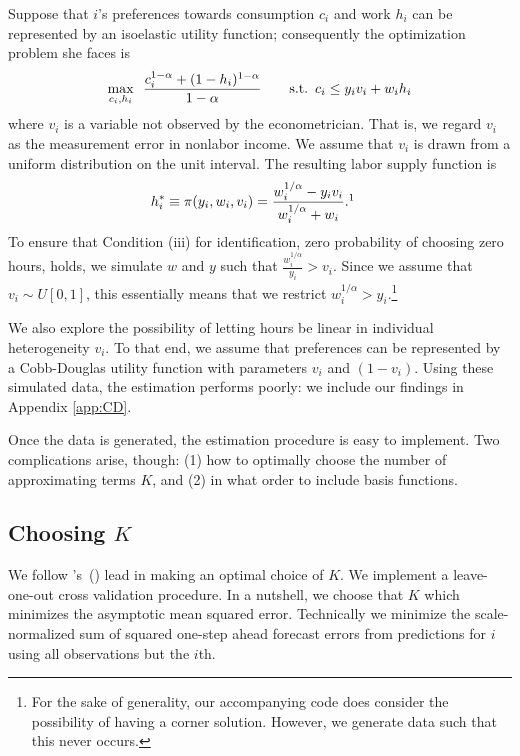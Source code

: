 \documentclass[11pt,letterpaper]{article}                  %
\newcommand\citepos[1]{\citeauthor{#1}'s\ (\citeyear{#1})}
\begin{document}
Suppose that $i$'s preferences towards consumption $c_i$ and work $h_i$ can be represented by an isoelastic utility function; consequently the optimization problem she faces is 
\begin{align*}
	\max_{c_i, h_i} \enskip \frac{c_i^{1-\alpha} + (1-h_i)^{1-\alpha}}{1-\alpha} \qquad \text{s.t.} \enskip c_i \leq y_i v_i + w_i h_i
\end{align*}
where $v_i$ is a variable not observed by the econometrician.
That is, we regard $v_i$ as the measurement error in nonlabor income.
We assume that $v_i$ is drawn from a uniform distribution on the unit interval.
The resulting labor supply function is
\begin{align*}
	h_i^* &\equiv \pi (y_i, w_i, v_i) = \frac{w_i^{1/\alpha} - y_i v_i}{w_i^{1/\alpha} + w_i}.\footnotemark
\end{align*}
To ensure that Condition (iii) for identification, zero probability of choosing zero hours, holds, we simulate $w$ and $y$ such that $\frac{w_i^{1/\alpha}}{y_i} > v_i$.
Since we assume that $v_i \sim U[0, 1]$, this essentially means that we restrict $w_i^{1/\alpha} > y_i$.\footnote{For the sake of generality, our accompanying code does consider the possibility of having a corner solution. However, we generate data such that this never occurs.}

We also explore the possibility of letting hours be linear in individual heterogeneity $v_i$.
To that end, we assume that preferences can be represented by a Cobb-Douglas utility function with parameters $v_i$ and $(1-v_i)$.
Using these simulated data, the estimation performs poorly: we include our findings in Appendix \ref{app:CD}.

\medskip
Once the data is generated, the estimation procedure is easy to implement.
Two complications arise, though: (1) how to optimally choose the number of approximating terms $K$, and (2) in what order to include basis functions.

\subsection{Choosing $K$}

We follow \citepos{Blomquist2002} lead in making an optimal choice of $K$.
We implement a leave-one-out cross validation procedure.
In a nutshell, we choose that $K$ which minimizes the asymptotic mean squared error.
Technically we minimize the scale-normalized sum of squared one-step ahead forecast errors from predictions for $i$ using all observations but the $i$th.
\end{document}
